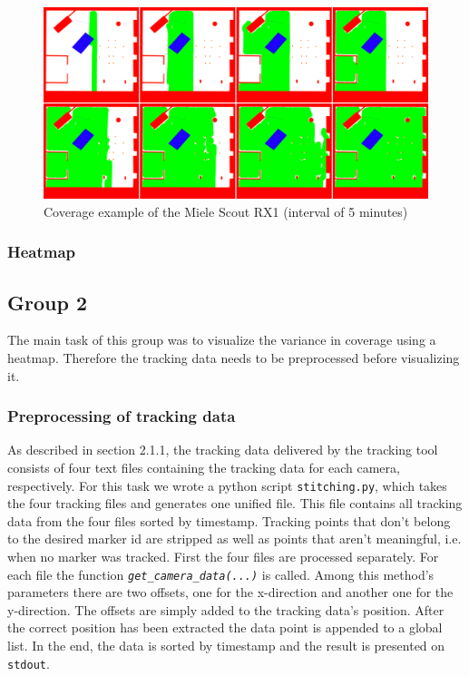 \documentclass[twoside]{article}
\begin{document}
\begin{figure}[H]
	\centering
	\includegraphics[width=\textwidth]{pictures/coverage_process.png}
	\caption{Coverage example of the Miele Scout RX1 (interval of 5 minutes)}
	\label{fig:coverage}
\end{figure}

\subsubsection{Heatmap} %

\subsection{Group 2} %
The main task of this group was to visualize the variance in coverage using a heatmap. Therefore the tracking data needs to be preprocessed before visualizing it.
\subsubsection{Preprocessing of tracking data}
As described in section 2.1.1, the tracking data delivered by the tracking tool consists of four text files containing the tracking data for each camera, respectively. For this task we wrote a python script \texttt{stitching.py}, which takes the four tracking files and generates one unified file. This file contains all tracking data from the four files sorted by timestamp. Tracking points that don't belong to the desired marker id are stripped as well as points that aren't meaningful, i.e. when no marker was tracked. First the four files are processed separately. For each file the function \textit{\texttt{get\_camera\_data(...)}} is called. Among this method's parameters there are two offsets, one for the x-direction and another one for the y-direction. The offsets are simply added to the tracking data's position. After the correct position has been extracted the data point is appended to a global list. In the end, the data is sorted by timestamp and the result is presented on \texttt{stdout}.
\end{document}
